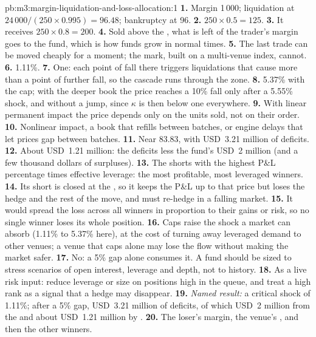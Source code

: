 \begin{solution}{pb:m3:margin-liquidation-and-loss-allocation:1}
\textbf{1.} Margin 1\,000; liquidation at $24\,000/(250 \times 0.995) = 96.48$; bankruptcy at 96. \textbf{2.} $250
\times 0.5 = 125$. \textbf{3.} It receives $250 \times 0.8 = 200$. \textbf{4.} Sold above the , what is left
of the trader's margin goes to the fund, which is how funds grow in normal times. \textbf{5.} The last trade can be moved
cheaply for a moment; the mark, built on a multi-venue index, cannot. \textbf{6.} 1.11\%. \textbf{7.} One: each point of
fall there triggers liquidations that cause more than a point of further fall, so the cascade runs through the zone.
\textbf{8.} 5.37\% with the cap; with the deeper book the price reaches a 10\% fall only after a 5.55\% shock, and without a jump, since $\kappa$ is then below one everywhere. \textbf{9.} With linear permanent impact the price depends only on the units sold, not on
their order. \textbf{10.} Nonlinear impact, a book that refills between batches, or engine delays that let prices gap
between batches. \textbf{11.} Near 83.83, with USD~3.21 million of deficits. \textbf{12.} About USD~1.21 million: the
deficits less the fund's USD~2 million (and a few thousand dollars of surpluses). \textbf{13.} The shorts with the highest
P\&L percentage times effective leverage: the most profitable, most leveraged winners. \textbf{14.} Its short is closed at
the , so it keeps the P\&L up to that price but loses the hedge and the rest of the move, and must re-hedge
in a falling market. \textbf{15.} It would spread the loss across all winners in proportion to their gains or risk, so no
single winner loses its whole position. \textbf{16.} Caps raise the shock a market can absorb (1.11\% to 5.37\% here), at
the cost of turning away leveraged demand to other venues; a venue that caps alone may lose the flow without making the
market safer. \textbf{17.} No: a 5\% gap alone consumes it. A fund should be sized to stress scenarios of open interest,
leverage and depth, not to history. \textbf{18.} As a live risk input: reduce leverage or size on positions high in the
queue, and treat a high rank as a signal that a hedge may disappear. \textbf{19.} \emph{Named result:} a critical shock of
1.11\%; after a 5\% gap, USD~3.21 million of deficits, of which USD~2 million from the  and about USD~1.21 million
by . \textbf{20.} The loser's margin, the venue's , and then the other winners.
\end{solution}

